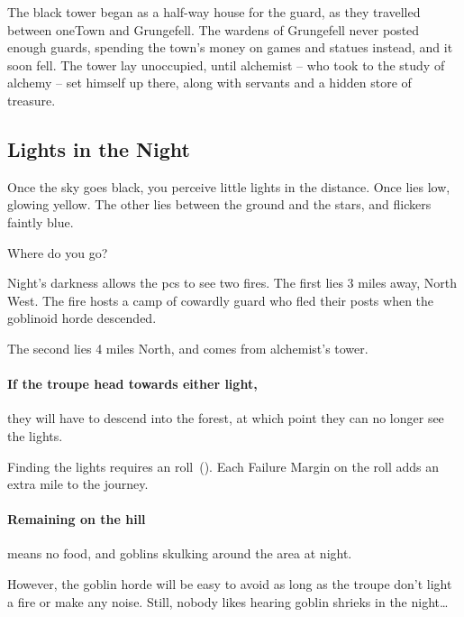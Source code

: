 \begin{multicols}{2}

\begin{exampletext}
  The black tower began as a half-way house for the \gls{guard}, as they travelled between \gls{oneTown} and Grungefell.
  The wardens of Grungefell never posted enough guards, spending the town's money on games and statues instead, and it soon fell.
  The tower lay unoccupied, until \gls{alchemist} --  who took to the study of alchemy -- set himself up there, along with servants and a hidden store of treasure.
\end{exampletext}

\subsection{Lights in the Night}

\begin{boxtext}
  Once the sky goes black, you perceive little lights in the distance.
  Once lies low, glowing yellow.
  The other lies between the ground and the stars, and flickers faintly blue.

  Where do you go?
\end{boxtext}

Night's darkness allows the \glspl{pc} to see two fires.
The first lies 3 miles away, North West.
The fire hosts a camp of cowardly \gls{guard} who fled their posts when the goblinoid horde descended.

The second lies 4 miles North, and comes from \gls{alchemist}'s tower.

\paragraph{If the troupe head towards either light,}
they will have to descend into the forest, at which point they can no longer see the lights.

Finding the lights requires an  roll~(\tn[9]).
Each Failure Margin on the roll adds an extra mile to the journey.

\paragraph{Remaining on the hill}
means no food, and goblins skulking around the area at night.

However, the goblin horde will be easy to avoid as long as the troupe don't light a fire or make any noise.
Still, nobody likes hearing goblin shrieks in the night\ldots


\end{multicols}
